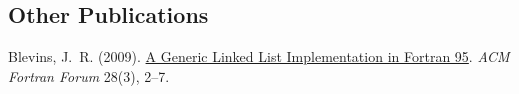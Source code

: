 \documentclass[10pt,letterpaper]{article}
\renewenvironment{itemize}{
  \begin{list}{}{
    \setlength{\leftmargin}{1.5em}
    \setlength{\itemsep}{0.25em}
    \setlength{\parskip}{0pt}
    \setlength{\parsep}{0.25em}
  }
}{
  \end{list}
}
\begin{document}
\subsection*{Other Publications}

\begin{itemize}

\item Blevins, J.~R. (2009).
  \href{http://jblevins.org/research/generic-list}{A Generic Linked List Implementation in Fortran 95}.
  \textit{ACM Fortran Forum} 28(3), 2--7.

\end{itemize}





\end{document}
